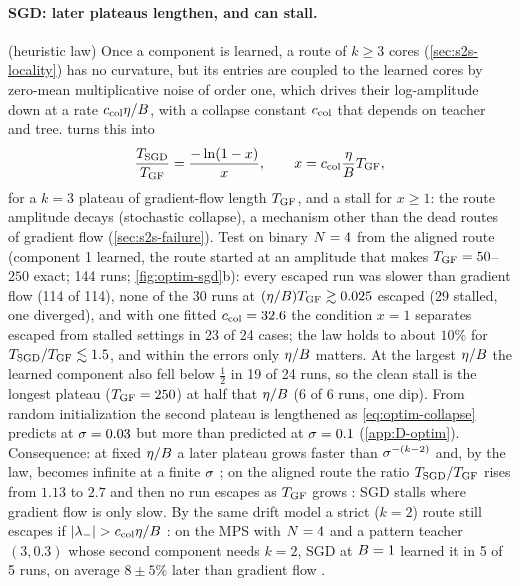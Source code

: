 \paragraph{SGD: later plateaus lengthen, and can stall.}
\conjecture{} (heuristic law) 
Once a component is learned, a route of $k\ge3$ cores (\cref{sec:s2s-locality}) has no curvature, but its entries are
coupled to the learned cores by zero-mean multiplicative noise of order one, which drives their log-amplitude down
at a rate $c_{\rm col}\eta/B$, with a collapse constant $c_{\rm col}$ that depends on teacher and tree.
 turns this into
\begin{equation}\label{eq:optim-collapse}
  \frac{T_{\rm SGD}}{T_{\rm GF}}=\frac{-\ln(1-x)}{x},\qquad x=c_{\rm col}\frac{\eta}{B}T_{\rm GF},
\end{equation}
for a $k=3$ plateau of gradient-flow length $T_{\rm GF}$, and a stall for $x\ge1$: the route amplitude decays
(stochastic collapse), a mechanism other than the dead routes of gradient flow (\cref{sec:s2s-failure}).
Test \empirical{} on binary $N=4$ from the aligned route (component 1 learned, the route started at an amplitude that makes $T_{\rm GF}=50$--$250$
exact; 144 runs; \cref{fig:optim-sgd}b): every escaped run was slower than gradient flow (114 of 114), none of the
30 runs at $(\eta/B)T_{\rm GF}\gtrsim0.025$ escaped (29 stalled, one diverged), and with one fitted
$c_{\rm col}=32.6$ the condition $x=1$ separates escaped from stalled settings in 23 of 24 cases; the law holds to
about $10\%$ for $T_{\rm SGD}/T_{\rm GF}\lesssim1.5$, and within the errors only $\eta/B$ matters. At the largest
$\eta/B$ the learned component also fell below $\frac12$ in 19 of 24 runs, so the clean stall is the longest
plateau ($T_{\rm GF}=250$) at half that $\eta/B$ (6 of 6 runs, one dip). From random initialization the second
plateau is lengthened as \eqref{eq:optim-collapse} predicts at $\sigma=0.03$ but more than predicted at $\sigma=0.1$
(\cref{app:D-optim}). Consequence: at fixed $\eta/B$ a later plateau grows faster than
$\sigma^{-(k-2)}$ and, by the law, becomes infinite at a finite $\sigma$ \conjecture; on the aligned route the ratio
$T_{\rm SGD}/T_{\rm GF}$ rises from $1.13$ to $2.7$ and then no run escapes as $T_{\rm GF}$ grows \empirical: SGD stalls
where gradient flow is only slow. By the same drift model a strict ($k=2$) route still escapes if
$\lvert\lambda_-\rvert>c_{\rm col}\eta/B$ \conjecture: on the MPS with $N=4$ and a pattern teacher $(3,0.3)$ whose second
component needs $k=2$, SGD at $B=1$ learned it in 5 of 5 runs, on average $8\pm5\%$ later than gradient flow
\empirical.

